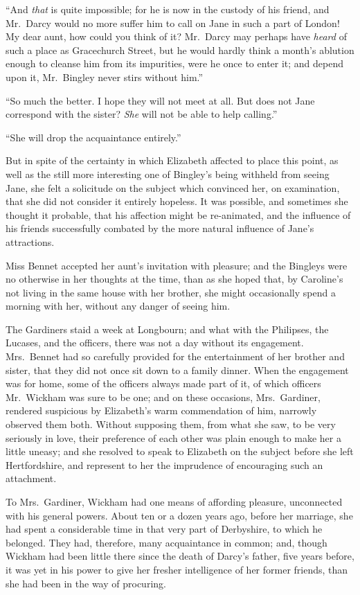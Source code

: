 “And \textit{that} is quite impossible; for he is now in the
custody of his friend, and Mr.\ Darcy would no more suffer
him to call on Jane in such a part of London! My dear
aunt, how could you think of it? Mr.\ Darcy may perhaps
have \textit{heard} of such a place as Gracechurch Street, but he
would hardly think a month’s ablution enough to cleanse
him from its impurities, were he once to enter it; and
depend upon it, Mr.\ Bingley never stirs without him.”

“So much the better. I hope they will not meet at
all. But does not Jane correspond with the sister? \textit{She}
will not be able to help calling.”

“She will drop the acquaintance entirely.”

But in spite of the certainty in which Elizabeth affected
to place this point, as well as the still more interesting
one of Bingley’s being withheld from seeing Jane, she
felt a solicitude on the subject which convinced her, on
examination, that she did not consider it entirely hopeless.
It was possible, and sometimes she thought it probable,
that his affection might be re-animated, and the influence
of his friends successfully combated by the more natural
influence of Jane’s attractions.

Miss Bennet accepted her aunt’s invitation with
pleasure; and the Bingleys were no otherwise in her
thoughts at the time, than as she hoped that, by Caroline’s
not living in the same house with her brother, she might
occasionally spend a morning with her, without any danger
of seeing him.

The Gardiners staid a week at Longbourn; and what
with the Philipses, the Lucases, and the officers, there
was not a day without its engagement. Mrs.\ Bennet
had so carefully provided for the entertainment of her
brother and sister, that they did not once sit down to
a family dinner. When the engagement was for home,
some of the officers always made part of it, of which officers
Mr.\ Wickham was sure to be one; and on these occasions,
Mrs.\ Gardiner, rendered suspicious by Elizabeth’s warm
commendation of him, narrowly observed them both.
Without supposing them, from what she saw, to be very
seriously in love, their preference of each other was plain
enough to make her a little uneasy; and she resolved to
speak to Elizabeth on the subject before she left Hertfordshire,
and represent to her the imprudence of encouraging
such an attachment.

To Mrs.\ Gardiner, Wickham had one means of affording
pleasure, unconnected with his general powers. About
ten or a dozen years ago, before her marriage, she had
spent a considerable time in that very part of Derbyshire,
to which he belonged. They had, therefore, many acquaintance
in common; and, though Wickham had been little
there since the death of Darcy’s father, five years before,
it was yet in his power to give her fresher intelligence of
her former friends, than she had been in the way of
procuring.

